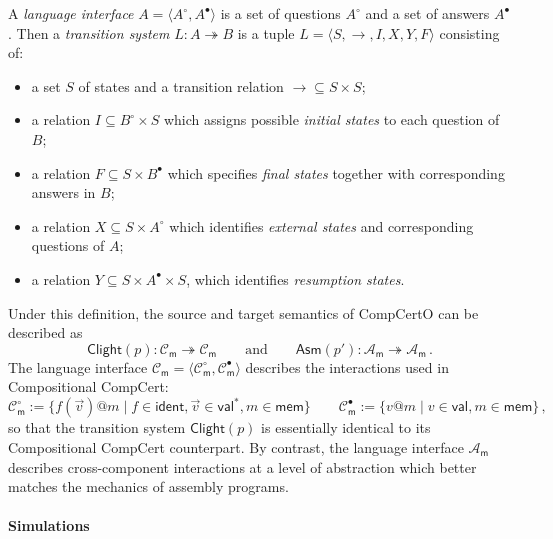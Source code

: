 \documentclass[acmsmall,screen,review,anonymous]{acmart}
\newcommand{\kw}[1]{\ensuremath{ \mathsf{#1} }}
\newcommand{\que}{\circ}
\newcommand{\ans}{\bullet}
\begin{document}
\begin{definition} \label{def:li} \label{def:lts} %
A \emph{language interface} $A = \langle A^\que, A^\ans \rangle$
is a set of questions $A^\que$ and a set of answers $A^\ans$.
Then a \emph{transition system} $L : A \twoheadrightarrow B$
is a tuple $L = \langle S, {\rightarrow}, I, X, Y, F \rangle$
consisting of:
\begin{itemize}
  \item a set $S$ of states and
    a transition relation ${\rightarrow} \subseteq S \times S$;
  \item a relation $I \subseteq B^\que \times S$
    which assigns possible \emph{initial states}
    to each question of $B$;
  \item a relation $F \subseteq S \times B^\ans$
    which specifies \emph{final states} together with
    corresponding answers in $B$;
  \item a relation $X \subseteq S \times A^\que$
    which identifies \emph{external states} and
    corresponding questions of $A$;
  \item a relation $Y \subseteq S \times A^\ans \times S$,
    which identifies \emph{resumption states}.
\end{itemize}
\end{definition}

Under this definition,
the source and target semantics of CompCertO can be described as
\[
  \kw{Clight}(p) : \mathcal{C}_\kw{m} \twoheadrightarrow \mathcal{C}_\kw{m}
  \qquad \text{and} \qquad
  \kw{Asm}(p') : \mathcal{A}_\kw{m} \twoheadrightarrow \mathcal{A}_\kw{m} \,.
\]
The language interface
$\mathcal{C}_\kw{m} = \langle \mathcal{C}_\kw{m}^\que, \mathcal{C}_\kw{m}^\ans \rangle$
describes the interactions used in Compositional CompCert:
\[
  \mathcal{C}_\kw{m}^\que :=
    \{ f(\vec{v})@m \mid f \in \kw{ident}, \vec{v} \in \kw{val}^*, m \in \kw{mem} \}
  \qquad
  \mathcal{C}_\kw{m}^\ans :=
    \{ v@m \mid v \in \kw{val}, m \in \kw{mem} \}
  \,,
\]
so that the transition system $\kw{Clight}(p)$ is essentially identical
to its Compositional CompCert counterpart.
By contrast, the language interface
$\mathcal{A}_\kw{m}$
describes cross-component interactions at a level of abstraction
which better matches the mechanics of assembly programs.


\paragraph{Simulations} %
\end{document}
